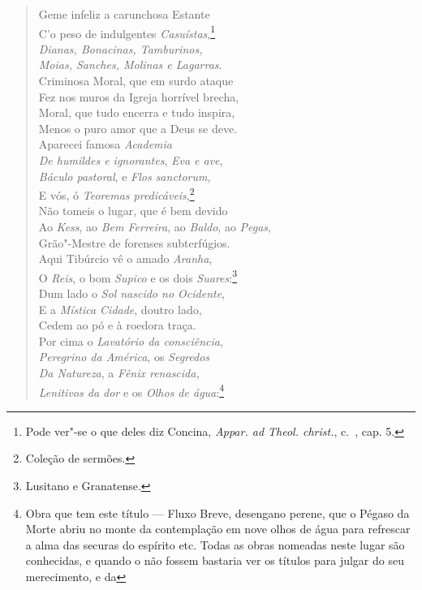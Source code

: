 \begin{verse}
Geme infeliz a carunchosa Estante\\
C'o peso de indulgentes \textit{Casuístas},\footnote{ Pode ver"-se o
que deles diz Concina, \textit{Appar. ad Theol. christ.}, c.~, cap. 5.}\\		\index{\Casui}
\textit{Dianas, Bonacinas, Tamburinos,}\\
\textit{Moias, Sanches, Molinas e Lagarras}.\\ %
Criminosa Moral, que em surdo ataque\\
Fez nos muros da Igreja horrível brecha,\\
Moral, que tudo encerra e tudo inspira,\\
Menos o puro amor que a Deus se deve.\\
Aparecei famosa \textit{Academia}\\
\textit{De humildes e ignorantes}, \textit{Eva e ave},\\
\textit{Báculo pastoral}, e \textit{Flos sanctorum},\\
E vós, ó \textit{Teoremas predicáveis},\footnote{ Coleção de sermões.}\\
Não tomeis o lugar, que é bem devido\\
Ao \textit{Kess}, ao \textit{Bem Ferreira}, ao \textit{Baldo}, ao \textit{Pegas},\\
Grão"-Mestre de forenses subterfúgios.\\ %
Aqui Tibúrcio vê o amado \textit{Aranha},\\
O \textit{Reis}, o bom \textit{Supico} e os dois
\textit{Suares}:\footnote{ Lusitano e Granatense.}\\ %
Dum lado o \textit{Sol nascido no Ocidente},\\
E a \textit{Mística Cidade}, doutro lado,\\
Cedem ao pó e à roedora traça.\\
Por cima o \textit{Lavatório da consciência},\\
\textit{Peregrino da América}, os \textit{Segredos}\\
\textit{Da Natureza}, a \textit{Fênix renascida,}\\
\textit{Lenitivos da dor} e os \textit{Olhos de água}:\footnote{ Obra
que tem este título --- Fluxo Breve, desengano perene, que o Pégaso da Morte
abriu no monte da contemplação em nove olhos de água para refrescar a alma das
securas do espírito etc. Todas as obras nomeadas neste lugar são conhecidas, e
quando o não fossem bastaria ver os títulos para julgar do seu merecimento, e da
}
\end{verse}
